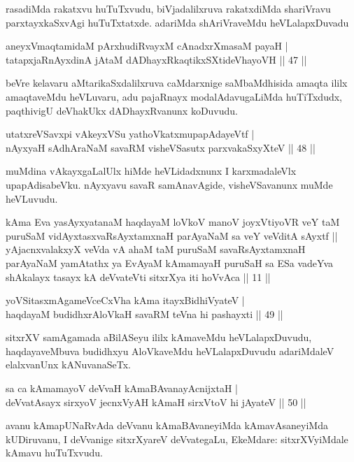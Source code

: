 \begin{artha}
rasadiMda rakatxvu huTuTxvudu, biVjadalilxruva rakatxdiMda shariVravu parxtayxkaSxvAgi huTuTxtatxde. adariMda shAriVraveMdu heVLalapxDuvadu 
\end{artha}

\begin{shl}
aneyxV\s maqtamidaM pArxhudiRvayxM cAnadxrXmasaM payaH |\\
tatapxjaRnAyxdinA jAtaM dADhayxRkaqtikxSXtideVhayoVH \hfill || 47 ||
\end{shl}

\begin{artha}%
beVre kelavaru aMtarikaSxdalilxruva caMdarxnige saMbaMdhisida amaqta ililx amaqtaveMdu heVLuvaru, adu pajaRnayx modalAdavugaLiMda huTiTxdudx, paqthivigU deVhakUkx dADhayxRvanunx koDuvudu.
\end{artha}

\begin{shl}
utatxreVSavxpi vAkeyxVSu yathoVkatxmupapAdayeVtf |\\
nAyxyaH sAdhAraNaM savaRM visheVSasutx parxvakaSxyXteV \hfill || 48 ||
\end{shl}

\begin{artha}
muMdina vAkayxgaLalUlx hiMde heVLidadxnunx I karxmadaleVlx upapAdisabeVku. nAyxyavu savaR samAnavAgide, visheVSavanunx muMde heVLuvudu.
\end{artha}

\begin{shl}
kAma Eva yasAyxyatanaM haqdayaM loVkoV manoV joyxVtiyoVR veY taM puruSaM vidAyxtasxvaRsAyxtamxnaH parAyaNaM sa veY veVditA sAyxtf || yAjacnxvalakxyX veVda vA ahaM taM puruSaM savaRsAyxtamxnaH parAyaNaM yamAtathx ya EvAyaM kAmamayaH puruSaH sa ESa vadeYva shAkalayx tasayx kA deVvateVti sitxrXya iti hoVvAca || 11 ||
\end{shl}


\begin{shl}
yoVSitasxmAgameVceCxVha kAma itayxBidhiVyateV |\\
haqdayaM budidhxrAloVkaH savaRM teVna hi pashayxti \hfill || 49 ||
\end{shl}

\begin{artha}
sitxrXV samAgamada aBilASeyu ililx kAmaveMdu heVLalapxDuvudu, haqdaya\-veMbuva budidhxyu AloVkaveMdu heVLalapxDuvudu adariMdaleV elalxvanUnx kANuvanaSeTx.
\end{artha}

\begin{shl}
sa ca kAmamayoV deVvaH kAmaBAvanayA\s cnijxtaH |\\
deVvatA\s sayx sirxyoV jecnxVyAH kAmaH sirxVtoV hi jAyateV \hfill || 50 ||
\end{shl}

\begin{artha}
avanu kAmapUNaRvAda deVvanu kAmaBAvaneyiMda kAmavAsaneyiMda kUDiruvanu, I deVvanige sitxrXyareV deVvategaLu, EkeMdare: sitxrXVyiMdale kAmavu huTuTxvudu.
\end{artha}
